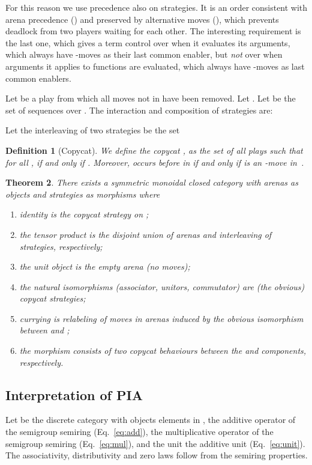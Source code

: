 \documentclass{article}
\newtheorem{theorem}{Theorem}
\newtheorem{definition}[theorem]{Definition}
\begin{document}
For this reason we use precedence also on strategies. It is an order consistent with arena precedence () and preserved by alternative moves (), which prevents deadlock from two players waiting for each other.  The interesting requirement is the last one, which gives a term control over when it evaluates its arguments, which always have -moves as their last common enabler, but \emph{not} over when arguments it applies to functions are evaluated, which always have -moves as last common enablers. 

Let  be a play from which all moves not in  have been removed. Let . Let  be the set of sequences over . The interaction and composition of  strategies  are:

Let the interleaving of two strategies  be the set





\newcommand{\copycat}{c\!c}
\begin{definition}[Copycat]\label{def:cc}
  We define the \emph{copycat} 
  , as the set of all
  plays  such that for all ,
   if and only if . Moreover, 
   occurs before  in  if and only if  is an -move in~.
\end{definition}

\begin{theorem}\label{thm:games}
There exists a symmetric monoidal closed category with arenas  as objects and strategies  as morphisms where
\begin{enumerate}
\item identity  is the copycat strategy on ;
\item the tensor product is the disjoint union of arenas and interleaving of strategies, respectively;
\item the unit object is the empty arena (no moves);
\item the natural isomorphisms (associator, unitors, commutator) are (the obvious) copycat strategies;
\item currying is relabeling of moves in arenas induced by the obvious isomorphism between  and ;
\item the morphism  consists of two copycat behaviours between the  and  components, respectively.
\end{enumerate}
\end{theorem}
\subsection{Interpretation of PIA}
Let  be the discrete category with objects elements in ,  the additive operator of the semigroup semiring (Eq.~\ref{eq:add}),  the multiplicative operator of the semigroup semiring (Eq.~\ref{eq:mul}), and the unit  the additive unit (Eq.~\ref{eq:unit}). The associativity, distributivity and zero laws  follow from the semiring properties. 
\end{document}
